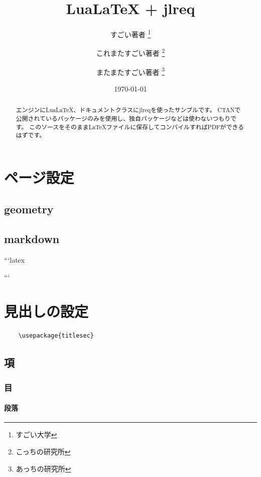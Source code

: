 \documentclass[article, head_space=25truemm, foot_space=15truemm, gutter=15truemm]{jlreq}
\title{LuaLaTeX + jlreq}
\author{
    すごい著者 \thanks{すごい大学} \\ \and
    これまたすごい著者 \thanks{こっちの研究所} \\ \and
    またまたすごい著者 \thanks{あっちの研究所}
}
\date{\today}
\begin{document}
\maketitle

\begin{abstract}
エンジンにLuaLaTeX、ドキュメントクラスにjlreqを使ったサンプルです。
CTANで公開されているパッケージのみを使用し、独自パッケージなどは使わないつもりです。
このソースをそのままLaTeXファイルに保存してコンパイルすればPDFができるはずです。
\end{abstract}

\tableofcontents

\section{ページ設定}

\subsection{geometry}

\subsection{markdown}

\begin{markdown}
```latex
\usepackage{markdown}
```
\end{markdown}

\section{見出しの設定}

\begin{verbatim}
    \usepackage{titlesec}
\end{verbatim}


\subsection{項}


\subsubsection{目}


\paragraph{段落}
\end{document}
